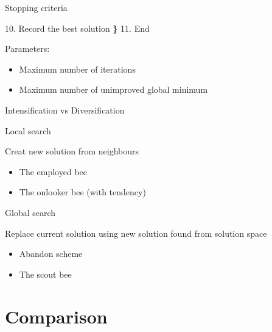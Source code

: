 \documentclass[14pt,ignorenonframetext,compress]{beamer}
\newenvironment{Shaded}{\begin{snugshade}}{\end{snugshade}}
\newcommand{\ErrorTok}[1]{\textcolor[rgb]{0.64,0.00,0.00}{\textbf{#1}}}
\newcommand{\FloatTok}[1]{\textcolor[rgb]{0.00,0.00,0.81}{#1}}
\newcommand{\NormalTok}[1]{#1}
\providecommand{\tightlist}{%
  \setlength{\itemsep}{0pt}\setlength{\parskip}{0pt}}
\renewenvironment{Shaded}{\color{black}\begin{snugshade}\color{black}}{\end{snugshade}}
\begin{document}
\begin{frame}[fragile]{Stopping criteria}
\protect\hypertarget{stopping-criteria}{}

\begin{Shaded}
\begin{Highlighting}[]
\FloatTok{10.}\NormalTok{ Record the best solution }\ErrorTok{\}}
\FloatTok{11.}\NormalTok{ End}
\end{Highlighting}
\end{Shaded}

Parameters:

\begin{itemize}
\tightlist
\item
  Maximum number of iterations
\item
  Maximum number of unimproved global minimum
\end{itemize}

\end{frame}

\begin{frame}{Intensification vs Diversification}
\protect\hypertarget{intensification-vs-diversification}{}

\begin{block}{Local search}

Creat new solution from neighbours

\begin{itemize}
\tightlist
\item
  The employed bee
\item
  The onlooker bee (with tendency)
\end{itemize}

\pause

\end{block}

\begin{block}{Global search}

Replace current solution using new solution found from solution space

\begin{itemize}
\tightlist
\item
  Abandon scheme
\item
  The scout bee
\end{itemize}

\end{block}

\end{frame}

\hypertarget{comparison}{%
\section{Comparison}\label{comparison}}
\end{document}
